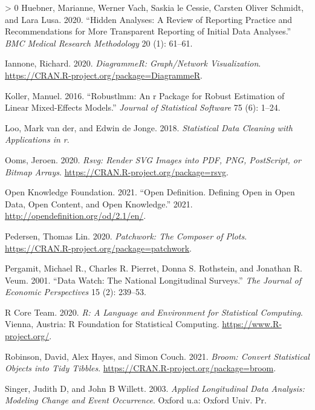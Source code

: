 \documentclass[12pt]{article}
\newlength{\cslhangindent}
\newenvironment{CSLReferences}[3] %
 {%
  \setlength{\parindent}{0pt}
  \ifodd #1 \everypar{\setlength{\hangindent}{\cslhangindent}}\ignorespaces\fi
  \ifnum #2 > 0
  \setlength{\parskip}{#2\baselineskip}
  \fi
 }%
 {}
\begin{document}
\begin{CSLReferences}{1}{0}
\leavevmode\hypertarget{ref-HuebnerMarianne2020Haar}{}%
Huebner, Marianne, Werner Vach, Saskia le Cessie, Carsten Oliver Schmidt, and Lara Lusa. 2020. {``Hidden Analyses: A Review of Reporting Practice and Recommendations for More Transparent Reporting of Initial Data Analyses.''} \emph{BMC Medical Research Methodology} 20 (1): 61--61.

\leavevmode\hypertarget{ref-DiagrammeR}{}%
Iannone, Richard. 2020. \emph{DiagrammeR: Graph/Network Visualization}. \url{https://CRAN.R-project.org/package=DiagrammeR}.

\leavevmode\hypertarget{ref-KollerManuel2016rARP}{}%
Koller, Manuel. 2016. {``Robustlmm: An r Package for Robust Estimation of Linear Mixed-Effects Models.''} \emph{Journal of Statistical Software} 75 (6): 1--24.

\leavevmode\hypertarget{ref-LooMarkvander2018Sdcw}{}%
Loo, Mark van der, and Edwin de Jonge. 2018. \emph{Statistical Data Cleaning with Applications in r}.

\leavevmode\hypertarget{ref-rsvg}{}%
Ooms, Jeroen. 2020. \emph{Rsvg: Render SVG Images into PDF, PNG, PostScript, or Bitmap Arrays}. \url{https://CRAN.R-project.org/package=rsvg}.

\leavevmode\hypertarget{ref-opendata}{}%
Open Knowledge Foundation. 2021. {``Open Definition. Defining Open in Open Data, Open Content, and Open Knowledge.''} 2021. \url{http://opendefinition.org/od/2.1/en/}.

\leavevmode\hypertarget{ref-patchwork}{}%
Pedersen, Thomas Lin. 2020. \emph{Patchwork: The Composer of Plots}. \url{https://CRAN.R-project.org/package=patchwork}.

\leavevmode\hypertarget{ref-MichaelRPergamit2001DWTN}{}%
Pergamit, Michael R., Charles R. Pierret, Donna S. Rothstein, and Jonathan R. Veum. 2001. {``Data Watch: The National Longitudinal Surveys.''} \emph{The Journal of Economic Perspectives} 15 (2): 239--53.

\leavevmode\hypertarget{ref-R}{}%
R Core Team. 2020. \emph{R: A Language and Environment for Statistical Computing}. Vienna, Austria: R Foundation for Statistical Computing. \url{https://www.R-project.org/}.

\leavevmode\hypertarget{ref-broom}{}%
Robinson, David, Alex Hayes, and Simon Couch. 2021. \emph{Broom: Convert Statistical Objects into Tidy Tibbles}. \url{https://CRAN.R-project.org/package=broom}.

\leavevmode\hypertarget{ref-SingerJudithD2003Alda}{}%
Singer, Judith D, and John B Willett. 2003. \emph{Applied Longitudinal Data Analysis: Modeling Change and Event Occurrence}. Oxford u.a: Oxford Univ. Pr.


\end{CSLReferences}
\end{document}
